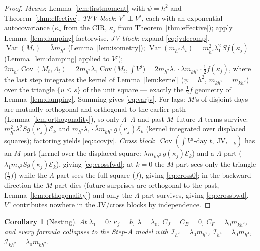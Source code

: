 \documentclass[11pt]{report}
\newtheorem{corollary}[theorem]{Corollary}
\theoremstyle{definition}
\theoremstyle{remark}
\newcommand{\Var}{\operatorname{Var}}
\newcommand{\Cov}{\operatorname{Cov}}
\newcommand{\Vc}{V^{c}}
\newcommand{\Vj}{V^{j}}
\newcommand{\JV}{\mathrm{JV}}
\newcommand{\mh}{m_{h^{2}}}
\newcommand{\mhh}{m_{h^{4}}}
\newcommand{\mkh}{m_{kh^{2}}}
\begin{document}
\begin{proof}
\emph{Means}: Lemma~\ref{lem:firstmoment} with $\psi=h^{2}$ and
Theorem~\ref{thm:effective}. \emph{TPV block}: $\Vc\perp\Vj$, each with an
exponential autocovariance ($\kappa_c$ from the CIR, $\kappa_j$ from
Theorem~\ref{thm:effective}); apply Lemma~\ref{lem:damping} factorwise.
\emph{JV block}: expand \eqref{eq:jvdecomp}.
$\Var(M_t)=\bar\lambda\mhh$ (Lemma~\ref{lem:isometry});
$\Var(\mh\Lambda_t)=\mh^2\lambda_1^2\,S f(\kappa_j)$
(Lemma~\ref{lem:damping} applied to $\Vj$);
$2\mh\Cov(M_t,\Lambda_t)
=2\mh\lambda_1\Cov\big(M_t,\int\Vj\big)
=2\mh\lambda_1\cdot\bar\lambda\mkh\cdot\tfrac12 f(\kappa_j)$, where the last
step integrates the kernel of Lemma~\ref{lem:kernel} ($\psi=h^2$,
$m_{kh^2}=\mkh$) over the triangle $\{u\le s\}$ of the unit square ---
exactly the $\tfrac12 f$ geometry of Lemma~\ref{lem:damping}. Summing gives
\eqref{eq:varjv}. For lags: $M$'s of disjoint days are mutually orthogonal
and orthogonal to the earlier path (Lemma~\ref{lem:orthogonality}), so only
$\Lambda$--$\Lambda$ and past-$M$--future-$\Lambda$ terms survive:
$\mh^2\lambda_1^2 S g(\kappa_j)\mathcal{E}_k$ and
$\mh\lambda_1\cdot\bar\lambda\mkh\,g(\kappa_j)\mathcal{E}_k$ (kernel
integrated over displaced squares); factoring yields \eqref{eq:acovjv}.
\emph{Cross block}: $\Cov(\int\Vj\text{-day }t,\ \JV_{t-k})$ has an
$M$-part (kernel over the displaced square:
$\bar\lambda\mkh\,g(\kappa_j)\mathcal{E}_k$) and a $\Lambda$-part
($\lambda_1\mh S g(\kappa_j)\mathcal{E}_k$), giving \eqref{eq:crossfwd};
at $k=0$ the $M$-part sees only the triangle ($\tfrac12 f$) while the
$\Lambda$-part sees the full square ($f$), giving \eqref{eq:cross0}; in the
backward direction the $M$-part dies (future surprises are orthogonal to the
past, Lemma~\ref{lem:orthogonality}) and only the $\Lambda$-part survives,
giving \eqref{eq:crossbwd}. $\Vc$ contributes nowhere in the JV/cross blocks
by independence.
\end{proof}

\begin{corollary}[Nesting]\label{cor:nesting}
At $\lambda_{1}=0$: $\kappa_{j}=b$, $\bar\lambda=\lambda_0$,
$C_{J}=C_{B}=0$, $C_{F}=\lambda_{0}\mkh$, and every formula collapses to the
Step-A model with $\mathcal{I}_{h^2}=\lambda_0\mh$,
$\mathcal{I}_{h^4}=\lambda_0\mhh$, $\mathcal{I}_{kh^2}=\lambda_0\mkh$.
\end{corollary}
\end{document}

